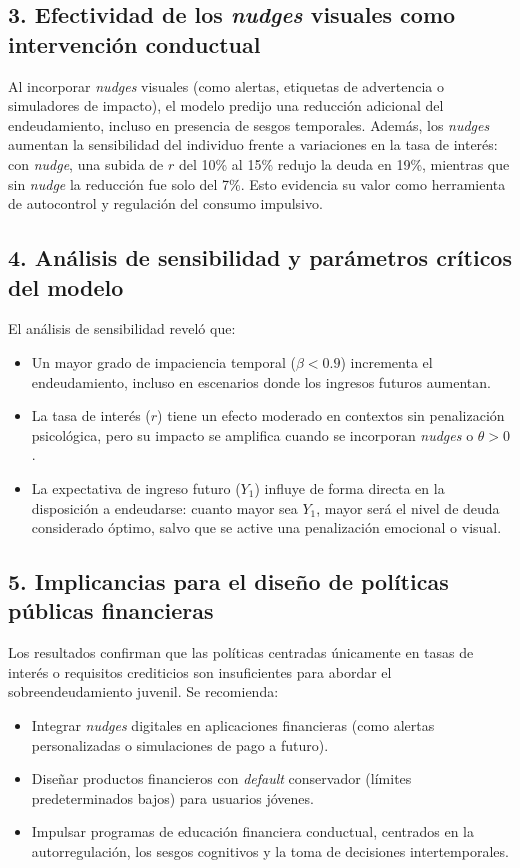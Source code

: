 \documentclass[10pt]{article}
\begin{document}
\begin{multicols}{2}
\subsection*{3. Efectividad de los \textit{nudges} visuales como intervención conductual}
Al incorporar \textit{nudges} visuales (como alertas, etiquetas de advertencia o simuladores de impacto), el modelo predijo una reducción adicional del endeudamiento, incluso en presencia de sesgos temporales. Además, los \textit{nudges} aumentan la sensibilidad del individuo frente a variaciones en la tasa de interés: con \textit{nudge}, una subida de $r$ del 10\% al 15\% redujo la deuda en 19\%, mientras que sin \textit{nudge} la reducción fue solo del 7\%. Esto evidencia su valor como herramienta de autocontrol y regulación del consumo impulsivo.

\subsection*{4. Análisis de sensibilidad y parámetros críticos del modelo}
El análisis de sensibilidad reveló que:
\begin{itemize}
  \item Un mayor grado de impaciencia temporal ($\beta < 0.9$) incrementa el endeudamiento, incluso en escenarios donde los ingresos futuros aumentan.
  \item La tasa de interés ($r$) tiene un efecto moderado en contextos sin penalización psicológica, pero su impacto se amplifica cuando se incorporan \textit{nudges} o $\theta > 0$.
  \item La expectativa de ingreso futuro ($Y_1$) influye de forma directa en la disposición a endeudarse: cuanto mayor sea $Y_1$, mayor será el nivel de deuda considerado óptimo, salvo que se active una penalización emocional o visual.
\end{itemize}

\subsection*{5. Implicancias para el diseño de políticas públicas financieras}
Los resultados confirman que las políticas centradas únicamente en tasas de interés o requisitos crediticios son insuficientes para abordar el sobreendeudamiento juvenil. Se recomienda:
\begin{itemize}
  \item Integrar \textit{nudges} digitales en aplicaciones financieras (como alertas personalizadas o simulaciones de pago a futuro).
  \item Diseñar productos financieros con \textit{default} conservador (límites predeterminados bajos) para usuarios jóvenes.
  \item Impulsar programas de educación financiera conductual, centrados en la autorregulación, los sesgos cognitivos y la toma de decisiones intertemporales.
\end{itemize}


\end{multicols}
\end{document}
